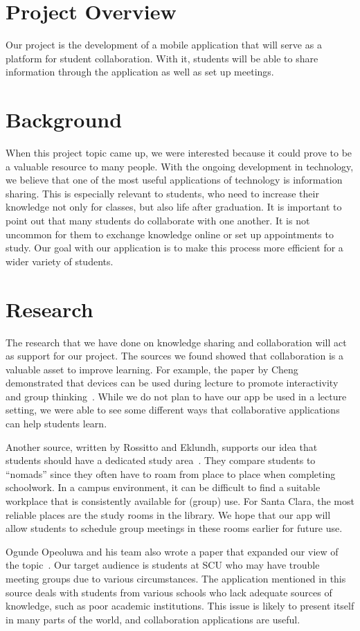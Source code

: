 \section{Project Overview}

Our project is the development of a mobile application that will serve as a platform for student collaboration. With it, students will be able to share information through the application as well as set up meetings.

\section{Background}

When this project topic came up, we were interested because it could prove to be a valuable resource to many people. With the ongoing development in technology, we believe that one of the most useful applications of technology is information sharing. This is especially relevant to students, who need to increase their knowledge not only for classes, but also life after graduation. It is important to point out that many students do collaborate with one another. It is not uncommon for them to exchange knowledge online or set up appointments to study. Our goal with our application is to make this process more efficient for a wider variety of students.

\section{Research}

The research that we have done on knowledge sharing and collaboration will act as support for our project. The sources we found showed that collaboration is a valuable asset to improve learning. For example, the paper by Cheng demonstrated that devices can be used during lecture to promote interactivity and group thinking~\cite{Chang2015}. While we do not plan to have our app be used in a lecture setting, we were able to see some different ways that collaborative applications can help students learn.

Another source, written by Rossitto and Eklundh, supports our idea that students should have a dedicated study area~\cite{Rossitto2007}. They compare students to “nomads” since they often have to roam from place to place when completing schoolwork. In a campus environment, it can be difficult to find a suitable workplace that is consistently available for (group) use. For Santa Clara, the most reliable places are the study rooms in the library. We hope that our app will allow students to schedule group meetings in these rooms earlier for future use.

Ogunde Opeoluwa and his team also wrote a paper that expanded our view of the topic~\cite{Opeoluwa2011}. Our target audience is students at SCU who may have trouble meeting groups due to various circumstances. The application mentioned in this source deals with students from various schools who lack adequate sources of knowledge, such as poor academic institutions. This issue is likely to present itself in many parts of the world, and collaboration applications are useful.

